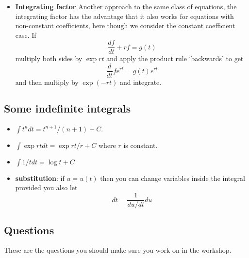 \documentclass[11pt,a4paper]{scrartcl}
\begin{document}
\begin{itemize}
\item \textbf{Integrating factor} Another approach to the same class of equations, the integrating factor has the advantage that it also works for equations with non-constant coefficients, here though we consider the constant coefficient case. If
  \begin{equation}
    \frac{df}{dt}+rf=g(t)
  \end{equation}
  multiply both sides by $\exp{rt}$ and apply the product rule `backwards' to get
  \begin{equation}
    \frac{d}{dt}fe^{rt}=g(t)e^{rt}
  \end{equation}
  and then multiply by $\exp{(-rt)}$ and integrate.
  
\end{itemize}

\subsection*{Some indefinite integrals}
\begin{itemize}
\item $\int t^ndt =t^{n+1}/(n+1)+C$.
\item $\int \exp{rt}dt = \exp{rt}/r +C$ where $r$ is constant.
\item $\int 1/t{} dt = \log{t}+C$
\item \textbf{substitution}: if $u=u(t)$ then you can change variables inside the integral provided you also let
  \begin{equation}
    dt=\frac{1}{du/dt}du
  \end{equation}
\end{itemize}
  
\subsection*{Questions}

These are the questions you should make sure you work on in the workshop.
\end{document}
